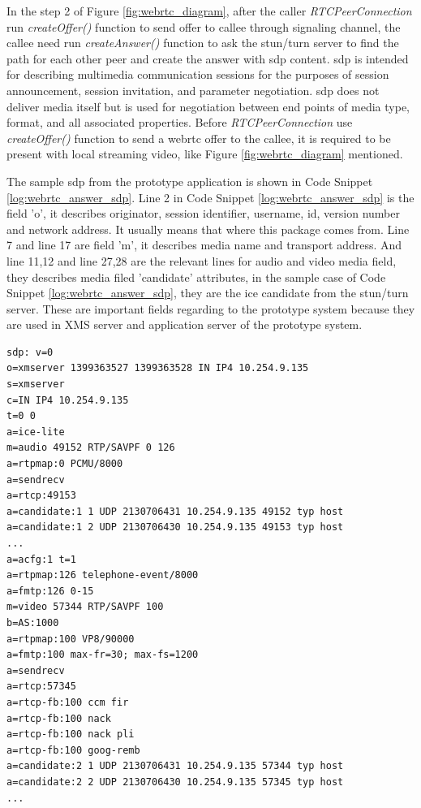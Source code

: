 \par In the step 2 of Figure \ref{fig:webrtc_diagram}, after the caller \textit{RTCPeerConnection} run \textit{createOffer()} function to send offer to callee through signaling channel, the callee need run \textit{createAnswer()} function to ask the \gls{stun}/\gls{turn} server to find the path for each other peer and create the answer with \gls{sdp} content. \gls{sdp} is intended for describing multimedia communication sessions for the purposes of session announcement, session invitation, and parameter negotiation. \gls{sdp} does not deliver media itself but is used for negotiation between end points of media type, format, and all associated properties.\cite{wiki:sdp} Before \textit{RTCPeerConnection} use \textit{createOffer()} function to send a \gls{webrtc} offer to the callee, it is required to be present with local streaming video, like Figure \ref{fig:webrtc_diagram} mentioned.

\par The sample \gls{sdp} from the prototype application is shown in Code Snippet \ref{log:webrtc_answer_sdp}. Line 2 in Code Snippet \ref{log:webrtc_answer_sdp} is the field 'o', it describes originator, session identifier, username, id, version number and network address. It usually means that where this package comes from. Line 7 and line 17 are field 'm', it describes media name and transport address. And line 11,12 and line 27,28 are the relevant lines for audio and video media field, they describes media filed 'candidate' attributes, in the sample case of Code Snippet \ref{log:webrtc_answer_sdp}, they are the \gls{ice} candidate from the \gls{stun}/\gls{turn} server. These are important fields regarding to the prototype system because they are used in XMS server and application server of the prototype system.

\begin{lstlisting}[caption={Sample \gls{webrtc} Answer \gls{sdp}},label={log:webrtc_answer_sdp}]
sdp: v=0
o=xmserver 1399363527 1399363528 IN IP4 10.254.9.135
s=xmserver
c=IN IP4 10.254.9.135
t=0 0
a=ice-lite
m=audio 49152 RTP/SAVPF 0 126
a=rtpmap:0 PCMU/8000
a=sendrecv
a=rtcp:49153
a=candidate:1 1 UDP 2130706431 10.254.9.135 49152 typ host
a=candidate:1 2 UDP 2130706430 10.254.9.135 49153 typ host
...
a=acfg:1 t=1
a=rtpmap:126 telephone-event/8000
a=fmtp:126 0-15
m=video 57344 RTP/SAVPF 100
b=AS:1000
a=rtpmap:100 VP8/90000
a=fmtp:100 max-fr=30; max-fs=1200
a=sendrecv
a=rtcp:57345
a=rtcp-fb:100 ccm fir
a=rtcp-fb:100 nack
a=rtcp-fb:100 nack pli
a=rtcp-fb:100 goog-remb
a=candidate:2 1 UDP 2130706431 10.254.9.135 57344 typ host
a=candidate:2 2 UDP 2130706430 10.254.9.135 57345 typ host
...
\end{lstlisting}

